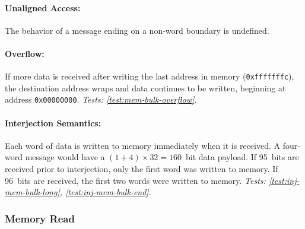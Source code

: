 \paragraph{Unaligned Access:} The behavior of a message ending on a
non-word boundary is undefined.

\paragraph{Overflow:} If more data is received after writing the last
address in memory ({\tt 0xfffffffc}), the destination address wraps and data
continues to be written, beginning at address {\tt 0x00000000}.
{\em Tests: \ref{test:mem-bulk-overflow}.}

\paragraph{Interjection Semantics:} Each word of data is written to memory
immediately when it is received. A four-word message would have a
$(1+4)\times32=160$~bit data payload. If 95~bits are received prior to
interjection, only the first word was written to memory. If 96~bits are
received, the first two words were written to memory.
{\em Tests: \ref{test:inj-mem-bulk-long}, \ref{test:inj-mem-bulk-end}.}

\newpage

\subsubsection{Memory Read}
\label{cmd:mem-read}

